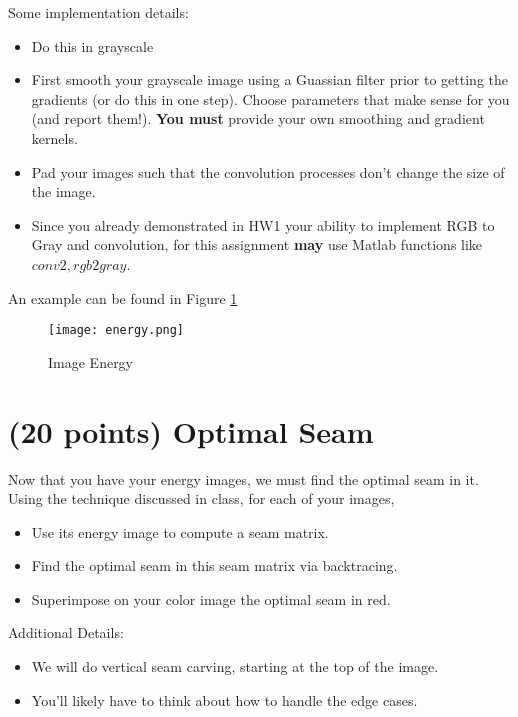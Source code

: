 \documentclass[12pt]{article}
\begin{document}
\noindent
Some implementation details:
\begin{itemize}
\item Do this in grayscale
\item First smooth your grayscale image using a Guassian filter prior to getting the gradients (or do this in one step).  Choose parameters that make sense for you (and report them!).  \textbf{You must} provide your own smoothing and gradient kernels.
\item Pad your images such that the convolution processes don’t change the size of the image.
\item Since you already demonstrated in HW1 your ability to implement RGB to Gray and convolution, for this assignment \textbf{may} use Matlab functions like $conv2, rgb2gray$.
\end{itemize}

\noindent
An example can be found in Figure \ref{fig1}

\begin{figure}[H]
\begin{center}
\texttt{[image: energy.png]}
\caption{Image Energy}
\label{fig1}
\end{center}
\end{figure}

\newpage

\section{(20 points) Optimal Seam}
Now that you have your energy images, we must find the optimal seam in it.\\

\noindent
Using the technique discussed in class, for each of your images, 

\begin{itemize}
\item Use its energy image to compute a seam matrix.
\item Find the optimal seam in this seam matrix via backtracing.
\item Superimpose on your color image the optimal seam in red.
\end{itemize}

\noindent
Additional Details:
\begin{itemize}
\item We will do vertical seam carving, starting at the top of the image.
\item You’ll likely have to think about how to handle the edge cases.
\end{itemize}
\end{document}

